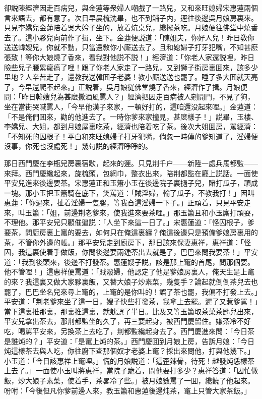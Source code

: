 卻説陳經濟因走百病兒，與金蓮等衆婦人嘲戲了一路兒，又和來旺媳婦宋惠蓮兩個言來語去，都有意了。次日早晨梳洗畢，也不到舖子内，逕往後邊吳月娘房裏來。只見李嬌兒金蓮陪着吳大妗子坐的，放着炕桌兒，纔擺茶吃。月娘便往佛堂中燒香去了。這小夥兒向前作了揖，坐下。金蓮便説道：「陳姐夫，你好人兒！昨日敎你送送韓嫂兒，你就不動，只當還敎你小廝送去了。且和媳婦子打牙犯嘴，不知甚麽張致！等你大娘燒了香來，看我對他説不説！」經濟道：「你老人家還説哩，昨日險些兒子腰累㿚瘑了哩！跟了你老人家走了一路兒，又到獅子街房裏囬來，該多少里地？人辛苦走了，還教我送韓囬子老婆！教小廝送送也罷了。睡了多大囬就天亮了，今早還爬不起來。」正説着，吳月娘従佛堂燒了香來，經濟作了揖。月娘便問：「昨日韓嫂兒為甚麽撒酒風罵人？」經濟把因走百病被人剜開門，不見了狗，坐在當街哭喊罵人，「今早他漢子來家，一頓好打的，這咱還没起來哩。」金蓮道：「不是俺們囬來，勸的他進去了。一時你爹來家撞見，甚麽樣子！」説畢，玉樓、李嬌兒、大姐，都到月娘屋裏吃茶，經濟也陪着吃了茶。後次大姐囬房，駡經濟：「不知死的囚根子！平白和來旺媳婦子打牙犯嘴，倘忽一時傳的爹知道了，淫婦便沒事，你死也沒處死！」幾句説的經濟睜睜的。

那日西門慶在李瓶兒房裏宿歇，起來的遲。只見荆千户——新陞一處兵馬都監——來拜。西門慶纔起來，旋梳頭，包網巾，整衣出來，陪荆都監在廳上説話。一面使平安兒進來後邊要茶。宋惠蓮正和玉簫小玉在後邊院子裏撾子兒，賭打瓜子，頑成一塊。那小玉把玉簫騎在底下，笑罵道：「賊淫婦，輸了瓜子，不教我打！」因叫惠蓮：「你過來，扯着淫婦一隻腿，等我㒲這淫婦一下子。」正頑着，只見平安走來，叫玉簫：「姐，前邊荆老爹來，使我進來要茶哩。」那玉簫且和小玉廝打頑耍，不理他。那平安兒只顧催逼説：「人坐下來這一日了。」宋惠蓮道：「怪囚根子，爹要茶，問厨房裏上竃的要去，如何只在俺這裏纏？俺這後邊只是預備爹娘房裏用的茶，不管你外邊的帳。」那平安兒走到廚房下，那日該來保妻惠祥，惠祥道：「怪囚，我這裏使着手做飯，你問後邊要兩鍾茶出去就是了，巴巴來問我要茶！」平安道：「我到後頭來，後邊不打發茶。惠蓮嫂子説，該是那上竃的首尾，問那個要。他不管哩！」這惠祥便罵道：「賊潑婦，他認定了他是爹娘房裏人，俺天生是上竃的來？我這裏又做大家夥裏飯，又替大娘子炒素菜，幾隻手？論起就倒倒茶兒去也罷了，巴巴坐名兒來尋上竃的，上竃的是你叫的！誤了茶也罷，我偏不打發上去。」平安道：「荆老爹來坐了這一日，嫂子快些打發茶，我拿上去罷。遲了又惹爹駡！」當下這裏推那裏，那裏推這裏，就躭誤了半日。比及又等玉簫取茶菓茶匙兒出來，平安兒拿出茶去，那荆都監坐的久了，再三要起身，被西門慶留住。嫌茶冷不好吃，喝罵平安來，另換茶上去吃了，荆都監纔起身去了。西門慶進來問：「今日茶是誰炖的？」平安道：「是竃上炖的茶。」西門慶囬到月娘上房，告訴月娘：「今日炖這樣茶去與人吃，你往廚下查那個奴才老婆上竃？採出來問他，打與他幾下。」小玉道：「今日該惠祥上竃哩。」慌的月娘説道：「這歪辣骨，待死！越發炖恁樣茶上去了。」一面使小玉叫將惠祥，當院子跪着，問他要打多少？惠祥答道：「因忙做飯，炒大娘子素菜，使着手，茶畧冷了些。」被月娘數罵了一囬，纔饒了他起來。吩咐：「今後但凡你爹前邊人來，教玉簫和惠蓮後邊炖茶，竃上只管大家茶飯。」


